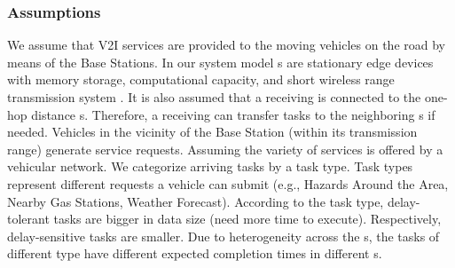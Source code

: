 \subsubsection{\textbf{Assumptions}}
We assume that V2I services are provided to the moving vehicles on the road by means of the Base Stations. In our system model \bs s are stationary edge devices with memory storage, computational capacity, and short wireless range transmission system \cite{liu2010rsu}. It is also assumed that a receiving \bs is connected to the one-hop distance \bs s. Therefore, a receiving \bs can transfer tasks to the neighboring \bs s if needed. Vehicles in the vicinity of the Base Station (within its transmission range) generate service requests. Assuming the variety of services is offered by a vehicular network. We categorize arriving tasks by a task type. Task types represent different requests a vehicle can submit (e.g., Hazards Around the Area, Nearby Gas Stations, Weather Forecast). According to the task type, delay-tolerant tasks are bigger in data size (need more time to execute). Respectively, delay-sensitive tasks are smaller. Due to heterogeneity across the \bs s, the tasks of different type have different expected completion times in different \bs s.

